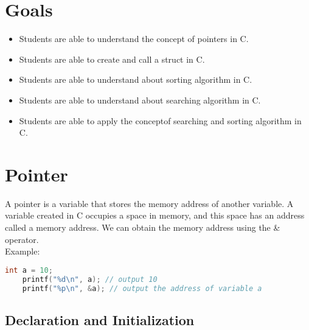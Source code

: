 \section*{Goals}
\begin{itemize}[label=$\bullet$, itemsep=-1pt, leftmargin=*]
    \item Students are able to understand the concept of pointers in C.
    \item Students are able to create and call a struct in C.
    \item Students are able to understand about sorting algorithm in C.
    \item Students are able to understand about searching algorithm in C.
    \item Students are able to apply the conceptof searching and sorting algorithm in C.
\end{itemize}

\section{Pointer}

A pointer is a variable that stores the memory address of another variable.
A variable created in C occupies a space in memory, and this space has an address called a memory address.
We can obtain the memory address using the \& operator. \\
Example:
\begin{lstlisting}[language=c]
	int a = 10;
	printf("%d\n", a); // output 10
	printf("%p\n", &a); // output the address of variable a
\end{lstlisting}

\subsection{Declaration and Initialization}

